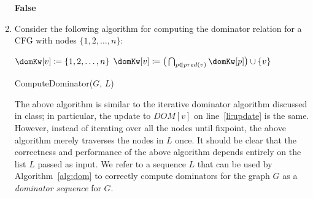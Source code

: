 \documentclass[12pt]{article}
\begin{document}
\begin{enumerate}
\begin{mdframed}

    
    \textbf{False} 
    
    
  \end{mdframed}
  

  \item  Consider the following algorithm for computing the dominator
  relation for a CFG with nodes $\{1,2,\dots,n\}$:

  {\centering
  \begin{minipage}{.9\linewidth}
    \begin{algorithm}[H]
      \DontPrintSemicolon

   
       {
        $\domKw[v] \coloneqq \{1, 2, \dots, n\}$
      }
       {
        $\domKw[v] \coloneqq \big( \bigcap_{p \in pred(v)} \domKw[p] \big) \cup \{v\}$\label{li:update}
      }
      \returnKw{$\domKw$}
    \caption{ComputeDominator($G$, $L$)}
    \label{alg:dom}
    \end{algorithm}
  \end{minipage}
  \par
  }

  The above algorithm is similar to the iterative dominator algorithm
  discussed in class; in particular, the update to $DOM[v]$ on
  line~\ref{li:update} is the same. However, instead of iterating over all
  the nodes until fixpoint, the above algorithm merely traverses the nodes
  in $L$ once. It should be clear that the correctness and performance of
  the above algorithm depends entirely on the list $L$ passed as input. We
  refer to a sequence $L$ that can be used by Algorithm~\ref{alg:dom} to
  correctly compute dominators for the graph $G$ as a \emph{dominator
  sequence} for $G$.


\end{enumerate}
\end{document}
